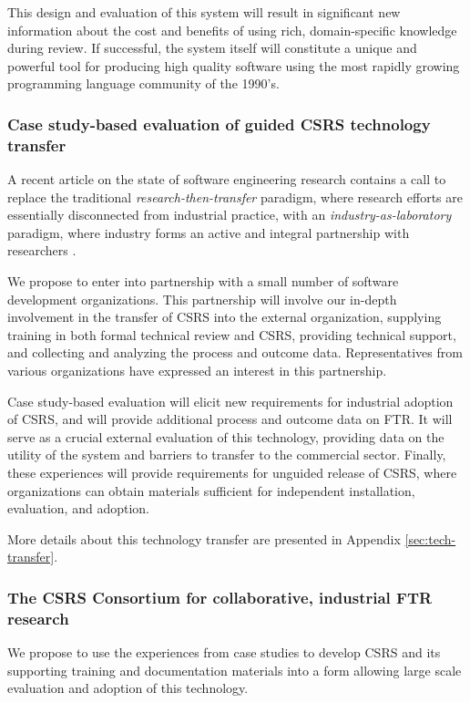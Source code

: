 This design and evaluation of this system will result in significant new
information about the cost and benefits of using rich, domain-specific
knowledge during review.  If successful, the system itself will constitute
a unique and powerful tool for producing high quality software using the
most rapidly growing programming language community of the 1990's.

\subsubsection{Case study-based evaluation of guided CSRS technology transfer}

A recent article on the state of software engineering research contains a
call to replace the traditional {\em research-then-transfer}\/ paradigm,
where research efforts are essentially disconnected from industrial
practice, with an {\em industry-as-laboratory}\/ paradigm, where industry
forms an active and integral partnership with researchers \cite{Potts93}.  

We propose to enter into partnership with a small number of software
development organizations.  This partnership will involve our in-depth
involvement in the transfer of CSRS into the external organization,
supplying training in both formal technical review and CSRS, providing
technical support, and collecting and analyzing the process and outcome
data.  Representatives from various organizations have expressed an
interest in this partnership.
  
Case study-based evaluation will elicit new requirements for industrial
adoption of CSRS, and will provide additional process and outcome data on
FTR.  It will serve as a crucial external evaluation of this technology,
providing data on the utility of the system and barriers to transfer to the
commercial sector.  Finally, these experiences will provide requirements
for unguided release of CSRS, where organizations can obtain materials
sufficient for independent installation, evaluation, and adoption.

More details about this technology transfer are presented in Appendix
\ref{sec:tech-transfer}.

\subsubsection{The CSRS Consortium for collaborative, industrial FTR research}

We propose to use the experiences from case studies to develop CSRS and its
supporting training and documentation materials into a form allowing large
scale evaluation and adoption of this technology.

